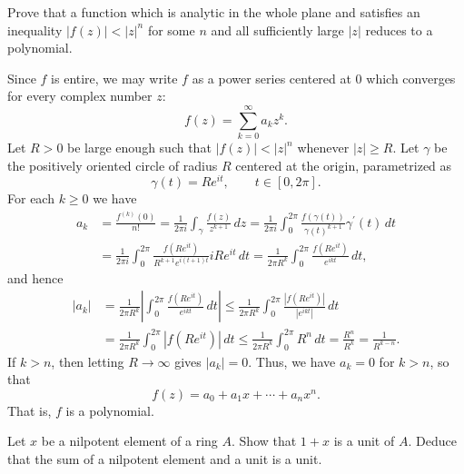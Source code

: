 \documentclass{homework}
\begin{document}
\begin{problem}[Ahlfors \S4.2.3 \#2, p. 123]
Prove that a function which is analytic in the whole plane and satisfies an
inequality $|f(z)| < |z|^n$ for some $n$ and all sufficiently large $|z|$
reduces to a polynomial.
\end{problem}

\begin{solution}
Since $f$ is entire, we may write $f$ as a power series centered at $0$ which
converges for every complex number $z$:
\begin{equation*}
f(z) = \sum_{k=0}^\infty a_k z^k.
\end{equation*}
Let $R > 0$ be large enough such that $|f(z)| < |z|^n$ whenever $|z| \geq R$.
Let $\gamma$ be the positively oriented circle of radius $R$ centered at the
origin, parametrized as
\begin{equation*}
\gamma(t) = R e^{i t},
\qquad
t \in [0,2\pi].
\end{equation*}
For each $k \geq 0$ we have
\begin{align*}
a_k
&= \frac{f^{(k)}(0)}{n!}
= \frac{1}{2 \pi i} \int_\gamma \frac{f(z)}{z^{k+1}} \, dz
= \frac{1}{2 \pi i} \int_0^{2\pi} \frac{f(\gamma(t))}{\gamma(t)^{k+1}} \gamma^\prime(t) \, dt
\\&= \frac{1}{2 \pi i} \int_0^{2\pi} \frac{f(R e^{i t})}{R^{k+1} e^{i(t+1) t}} i R e^{i t} \, dt
= \frac{1}{2 \pi R^k} \int_0^{2\pi} \frac{f(R e^{i t})}{e^{i k t}} \, dt,
\end{align*}
and hence
\begin{align*}
|a_k|
&= \frac{1}{2 \pi R^k} \left|\int_0^{2\pi} \frac{f(R e^{i t})}{e^{i k t}} \, dt\right|
\leq \frac{1}{2 \pi R^k} \int_0^{2\pi} \frac{|f(R e^{i t})|}{|e^{i k t}|} \, dt
\\&= \frac{1}{2 \pi R^k} \int_0^{2\pi} |f(R e^{i t})| \, dt
\leq \frac{1}{2 \pi R^k} \int_0^{2\pi} R^n \, dt
= \frac{R^n}{R^k}
= \frac{1}{R^{k - n}}.
\end{align*}
If $k > n$, then letting $R \to \infty$ gives $|a_k| = 0$.
Thus, we have $a_k = 0$ for $k > n$, so that
\begin{equation*}
f(z) = a_0 + a_1 x + \cdots + a_n x^n.
\end{equation*}
That is, $f$ is a polynomial.
\end{solution}

\begin{problem}
Let $x$ be a nilpotent element of a ring $A$.
Show that $1 + x$ is a unit of $A$.
Deduce that the sum of a nilpotent element and a unit is a unit.
\end{problem}
\end{document}
